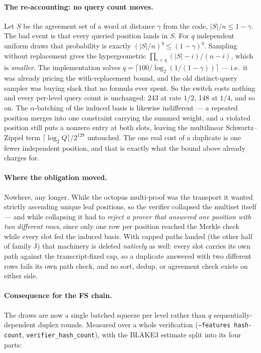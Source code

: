 \documentclass[11pt]{article}
\newcommand{\code}[1]{\texttt{#1}}
\theoremstyle{definition}
\begin{document}
\paragraph{The re-accounting: no query count moves.}
Let $S$ be the agreement set of a word at distance $\gamma$ from the
code, $|S|/n \le 1-\gamma$. The bad event is that every queried position
lands in $S$. For $q$ independent uniform draws that probability is
exactly $(|S|/n)^q \le (1-\gamma)^q$. Sampling without replacement gives
the hypergeometric $\prod_{i<q} (|S|-i)/(n-i)$, which is
\emph{smaller}. The implementation solves $q = \lceil 100 / \log_2
(1/(1-\gamma)) \rceil$ --- i.e.\ it was already pricing the
with-replacement bound, and the old distinct-query sampler was buying
slack that no formula ever spent. So the switch costs nothing and every
per-level query count is unchanged: 243 at rate $1/2$, 148 at $1/4$, and
so on. The $\alpha$-batching of the induced basis is likewise
indifferent --- a repeated position merges into one constraint carrying
the summed weight, and a violated position still puts a nonzero entry at
both slots, leaving the multilinear Schwartz--Zippel term $\lceil \log_2
Q\rceil / 2^{128}$ untouched. The one real cost of a duplicate is one
fewer independent position, and that is exactly what the bound above
already charges for.

\paragraph{Where the obligation moved.}
Nowhere, any longer. While the octopus multi-proof was the transport it
wanted strictly ascending unique leaf positions, so the verifier
collapsed the multiset itself --- and while collapsing it had to
\emph{reject a prover that answered one position with two different
rows}, since only one row per position reached the Merkle check while
every slot fed the induced basis. With capped paths landed (the other
half of family J) that machinery is deleted \emph{natively} as well:
every slot carries its own path against the transcript-fixed cap, so a
duplicate answered with two different rows fails its own path check,
and no sort, dedup, or agreement check exists on either side.

\paragraph{Consequence for the FS chain.}
The draws are now a single batched squeeze per level rather than $q$
sequentially-dependent duplex rounds. Measured over a whole verification
(\code{--features hash-count}, \code{verifier\_hash\_count}), with the
BLAKE3 estimate split into its four parts:
\end{document}
